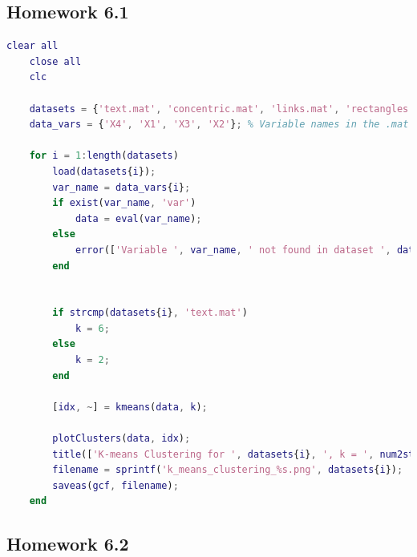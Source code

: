 \documentclass[11pt]{article}
\begin{document}
\subsection{Homework 6.1}

\begin{lstlisting}[language = matlab]
    clear all
    close all
    clc

    datasets = {'text.mat', 'concentric.mat', 'links.mat', 'rectangles.mat'};
    data_vars = {'X4', 'X1', 'X3', 'X2'}; % Variable names in the .mat files

    for i = 1:length(datasets)
        load(datasets{i});
        var_name = data_vars{i};
        if exist(var_name, 'var')
            data = eval(var_name); 
        else
            error(['Variable ', var_name, ' not found in dataset ', datasets{i}]);
        end


        if strcmp(datasets{i}, 'text.mat')
            k = 6; 
        else
            k = 2; 
        end

        [idx, ~] = kmeans(data, k);

        plotClusters(data, idx);
        title(['K-means Clustering for ', datasets{i}, ', k = ', num2str(k)]);
        filename = sprintf('k_means_clustering_%s.png', datasets{i}); 
        saveas(gcf, filename);
    end
\end{lstlisting}

\subsection{Homework 6.2}
\end{document}
